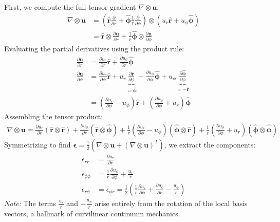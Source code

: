 First, we compute the full tensor gradient $\nabla \otimes \mathbf{u}$:
\begin{align}
    \nabla \otimes \mathbf{u} &= \left( \hat{\mathbf{r}} \frac{\partial}{\partial r} + \hat{\boldsymbol{\phi}} \frac{1}{r} \frac{\partial}{\partial \phi} \right) \otimes (u_r \hat{\mathbf{r}} + u_\phi \hat{\boldsymbol{\phi}}) \nonumber \\
    &= \hat{\mathbf{r}} \otimes \frac{\partial \mathbf{u}}{\partial r} + \frac{1}{r}\hat{\boldsymbol{\phi}} \otimes \frac{\partial \mathbf{u}}{\partial \phi}
\end{align}
Evaluating the partial derivatives using the product rule:
\begin{align}
    \frac{\partial \mathbf{u}}{\partial r} &= \frac{\partial u_r}{\partial r} \hat{\mathbf{r}} + \frac{\partial u_\phi}{\partial r} \hat{\boldsymbol{\phi}} \\
    \frac{\partial \mathbf{u}}{\partial \phi} &= \frac{\partial u_r}{\partial \phi} \hat{\mathbf{r}} + u_r \underbrace{\frac{\partial \hat{\mathbf{r}}}{\partial \phi}}_{=\hat{\boldsymbol{\phi}}} + \frac{\partial u_\phi}{\partial \phi} \hat{\boldsymbol{\phi}} + u_\phi \underbrace{\frac{\partial \hat{\boldsymbol{\phi}}}{\partial \phi}}_{=-\hat{\mathbf{r}}} \nonumber \\
    &= \left( \frac{\partial u_r}{\partial \phi} - u_\phi \right) \hat{\mathbf{r}} + \left( \frac{\partial u_\phi}{\partial \phi} + u_r \right) \hat{\boldsymbol{\phi}}
\end{align}
Assembling the tensor product:
\begin{align}
    \nabla \otimes \mathbf{u} = \frac{\partial u_r}{\partial r} (\hat{\mathbf{r}} \otimes \hat{\mathbf{r}}) + \frac{\partial u_\phi}{\partial r} (\hat{\mathbf{r}} \otimes \hat{\boldsymbol{\phi}}) + \frac{1}{r}\left( \frac{\partial u_r}{\partial \phi} - u_\phi \right) (\hat{\boldsymbol{\phi}} \otimes \hat{\mathbf{r}}) + \frac{1}{r}\left( \frac{\partial u_\phi}{\partial \phi} + u_r \right) (\hat{\boldsymbol{\phi}} \otimes \hat{\boldsymbol{\phi}})
\end{align}
Symmetrizing to find $\boldsymbol{\epsilon} = \frac{1}{2}(\nabla \otimes \mathbf{u} + (\nabla \otimes \mathbf{u})^T)$, we extract the components:
\begin{align}
    \epsilon_{rr} &= \frac{\partial u_r}{\partial r} \nonumber \\
    \epsilon_{\phi\phi} &= \frac{1}{r} \frac{\partial u_\phi}{\partial \phi} + \frac{u_r}{r} \\
    \epsilon_{r\phi} &= \epsilon_{\phi r} = \frac{1}{2}\left( \frac{1}{r}\frac{\partial u_r}{\partial \phi} + \frac{\partial u_\phi}{\partial r} - \frac{u_\phi}{r} \right) \nonumber 
\end{align}
\textit{Note:} The terms $\frac{u_r}{r}$ and $-\frac{u_\phi}{r}$ arise entirely from the rotation of the local basis vectors, a hallmark of curvilinear continuum mechanics.

